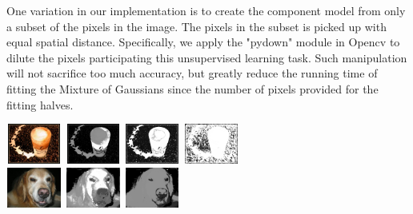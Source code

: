 \documentclass[10pt,twocolumn,letterpaper]{article}
\begin{document}
    One variation in our implementation is to create the component model from only a subset of the pixels in the image.
    The pixels in the subset is picked up with equal spatial distance. Specifically, we apply the "pydown" module 
    in Opencv to dilute the pixels participating this unsupervised learning task.
    Such manipulation will not sacrifice too much accuracy, but greatly reduce 
    the running time of fitting the Mixture of Gaussians since the number of pixels provided for the fitting halves. 

    \begin{center}
    \includegraphics[width=0.72in,height=0.52in]{./Figures/pydownCompare/1.jpg}
    \includegraphics[width=0.72in,height=0.52in]{./Figures/pydownCompare/1NOPYDOWN.jpg}
    \includegraphics[width=0.72in,height=0.52in]{./Figures/pydownCompare/1PYDOWN.jpg} 
    \includegraphics[width=0.72in,height=0.52in]{./Figures/pydownCompare/1DOUBLEPYDOWN.jpg} \\
    \includegraphics[width=0.72in,height=0.52in]{./Figures/pydownCompare/2.jpg}
    \includegraphics[width=0.72in,height=0.52in]{./Figures/pydownCompare/2NOPYDOWN.jpg}
    \includegraphics[width=0.72in,height=0.52in]{./Figures/pydownCompare/2PYDOWN.jpg} 

\end{center}
\end{document}

